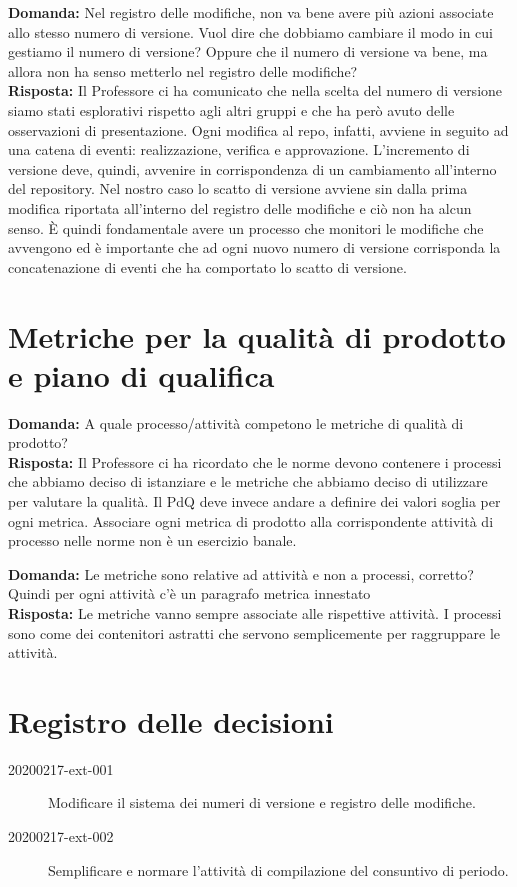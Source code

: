 \documentclass{article}
\begin{document}
\textbf{Domanda:} Nel registro delle modifiche, non va bene avere più azioni associate allo stesso numero di versione.
Vuol dire che dobbiamo cambiare il modo in cui gestiamo il numero di versione?
Oppure che il numero di versione va bene, ma allora non ha senso metterlo nel registro delle modifiche?\\
\textbf{Risposta:} Il Professore ci ha comunicato che nella scelta del numero di versione siamo stati esplorativi rispetto agli altri gruppi e che ha però avuto delle osservazioni di presentazione.
Ogni modifica al repo, infatti, avviene in seguito ad una catena di eventi: realizzazione, verifica e approvazione.
L'incremento di versione deve, quindi, avvenire in corrispondenza di un cambiamento all'interno del repository.
Nel nostro caso lo scatto di versione avviene sin dalla prima modifica riportata all'interno del registro delle modifiche e ciò non ha alcun senso.
È quindi fondamentale avere un processo che monitori le modifiche che avvengono ed è importante che ad ogni nuovo numero di versione corrisponda la concatenazione di eventi che ha comportato lo scatto di versione.

\section{Metriche per la qualità di prodotto e piano di qualifica}%
\label{sec:metriche_per_la_qualita_di_prodotto_e_piano_di_qualifica}

\textbf{Domanda:} A quale processo/attività competono le metriche di qualità di prodotto?\\
\textbf{Risposta:} Il Professore ci ha ricordato che le norme devono contenere i processi che abbiamo deciso di istanziare e le metriche che abbiamo deciso di utilizzare per valutare la qualità.
Il PdQ deve invece andare a definire dei valori soglia per ogni metrica.
Associare ogni metrica di prodotto alla corrispondente attività di processo nelle norme non è un esercizio banale.

\textbf{Domanda:} Le metriche sono relative ad attività e non a processi, corretto? Quindi per ogni attività c'è un paragrafo metrica innestato\\
\textbf{Risposta:} Le metriche vanno sempre associate alle rispettive attività.
I processi sono come dei contenitori astratti che servono semplicemente per raggruppare le attività.

\newpage
\section{Registro delle decisioni}%
\label{sec:registro_delle_decisioni}

\begin{description}
  \item[20200217-ext-001] Modificare il sistema dei numeri di versione e registro delle modifiche.
  \item[20200217-ext-002] Semplificare e normare l'attività di compilazione del consuntivo di periodo.
\end{description}

\end{document}
